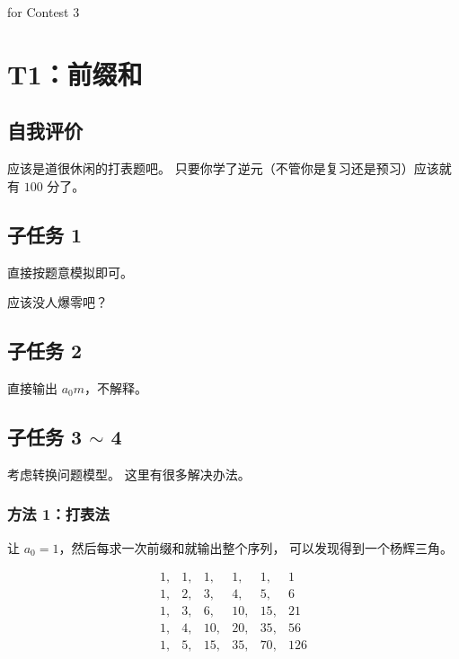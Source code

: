 \documentclass[UTF8]{article}
\title{\insertsubject}
\author{Orange}
\date{\today}
\begin{document}
	\maketitle

	\begin{center}
		for Contest 3
	\end{center}

	\newpage

	\section{T1：前缀和}

	\subsection{自我评价}

	应该是道很休闲的打表题吧。
	只要你学了逆元（不管你是复习还是预习）应该就有 $100$ 分了。

	\subsection{子任务 1}

	直接按题意模拟即可。

	应该没人爆零吧？

	\subsection{子任务 2}

	直接输出 $a_0 m$，不解释。

	\subsection{子任务 3 $\sim$ 4}

	考虑转换问题模型。
	这里有很多解决办法。

	\subsubsection{方法 1：打表法}

	让 $a_0 = 1$，然后每求一次前缀和就输出整个序列，
	可以发现得到一个杨辉三角。

	\begin{equation*}
		\begin{matrix}
			1,& 1,& 1,& 1,& 1,& 1
			\\
			1,& 2,& 3,& 4,& 5,& 6
			\\
			1,& 3,& 6,& 10,& 15,& 21
			\\
			1,& 4,& 10,& 20,& 35,& 56
			\\
			1,& 5,& 15,& 35,& 70,& 126
		\end{matrix}
	\end{equation*}
\end{document}
